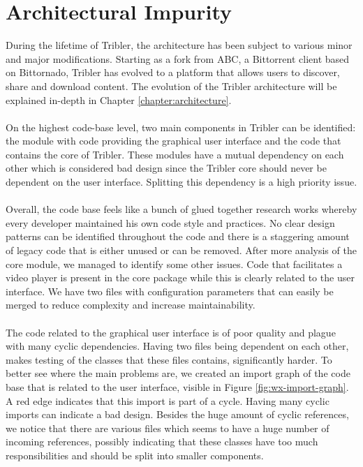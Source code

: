 \section{Architectural Impurity}
During the lifetime of Tribler, the architecture has been subject to various minor and major modifications. Starting as a fork from ABC, a Bittorrent client based on Bittornado, Tribler has evolved to a platform that allows users to discover, share and download content. The evolution of the Tribler architecture will be explained in-depth in Chapter \ref{chapter:architecture}.\\\\
On the highest code-base level, two main components in Tribler can be identified: the module with code providing the graphical user interface and the code that contains the core of Tribler. These modules have a mutual dependency on each other which is considered bad design since the Tribler core should never be dependent on the user interface. Splitting this dependency is a high priority issue.\\\\
Overall, the code base feels like a bunch of glued together research works whereby every developer maintained his own code style and practices. No clear design patterns can be identified throughout the code and there is a staggering amount of legacy code that is either unused or can be removed. After more analysis of the core module, we managed to identify some other issues. Code that facilitates a video player is present in the core package while this is clearly related to the user interface. We have two files with configuration parameters that can easily be merged to reduce complexity and increase maintainability.\\\\
The code related to the graphical user interface is of poor quality and plague with many cyclic dependencies. Having two files being dependent on each other, makes testing of the classes that these files contains, significantly harder. To better see where the main problems are, we created an import graph of the code base that is related to the user interface, visible in Figure \ref{fig:wx-import-graph}. A red edge indicates that this import is part of a cycle. Having many cyclic imports can indicate a bad design. Besides the huge amount of cyclic references, we notice that there are various files which seems to have a huge number of incoming references, possibly indicating that these classes have too much responsibilities and should be split into smaller components.\\

